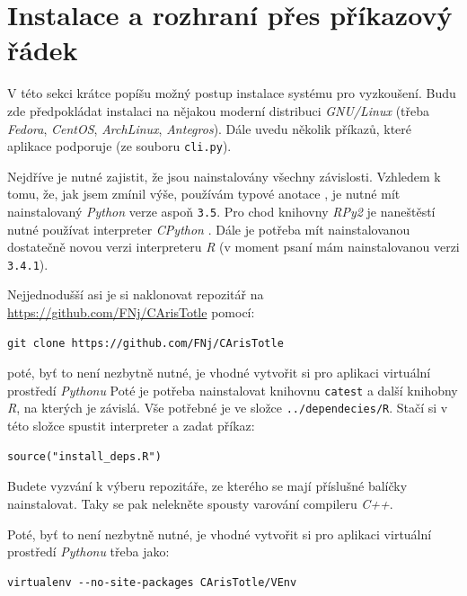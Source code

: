 \documentclass[a4paper,twoside,12pt]{scrbook}
\begin{document}
\newpage %
\appendix %



\section*{Instalace a rozhraní přes příkazový řádek}

V této sekci krátce popíšu možný postup instalace systému pro vyzkoušení. Budu zde předpokládat instalaci na nějakou moderní distribuci \textit{GNU/Linux} (třeba \textit{Fedora}, \textit{CentOS}, \textit{ArchLinux}, \textit{Antegros}). Dále uvedu několik příkazů, které aplikace podporuje (ze souboru \texttt{cli.py}).

Nejdříve je nutné zajistit, že jsou nainstalovány všechny závislosti. Vzhledem k tomu, že, jak jsem zmínil výše, používám typové anotace \cite{PEP484}, je nutné mít nainstalovaný \textit{Python} verze aspoň \texttt{3.5}. Pro chod knihovny \textit{RPy2} je naneštěstí nutné používat interpreter \textit{CPython} \cite{CPython}. Dále je potřeba mít nainstalovanou dostatečně novou verzi interpreteru \textit{R} (v moment psaní mám nainstalovanou verzi \texttt{3.4.1}).

Nejjednodušší asi je si naklonovat repozitář na \url{https://github.com/FNj/CArisTotle} pomocí:
\begin{verbatim}
git clone https://github.com/FNj/CArisTotle
\end{verbatim}
poté, byť to není nezbytně nutné, je vhodné vytvořit si pro aplikaci virtuální prostředí \textit{Pythonu}
Poté je potřeba nainstalovat knihovnu \texttt{catest} a další knihobny \textit{R}, na kterých je závislá. Vše potřebné je ve složce \texttt{../dependecies/R}. Stačí si v této složce spustit interpreter a zadat příkaz:
\begin{verbatim}
source("install_deps.R")
\end{verbatim}
Budete vyzvání k výberu repozitáře, ze kterého se mají příslušné balíčky nainstalovat. Taky se pak nelekněte spousty varování compileru \textit{C++}.

Poté, byť to není nezbytně nutné, je vhodné vytvořit si pro aplikaci virtuální prostředí \textit{Pythonu} třeba jako:
\begin{verbatim}
virtualenv --no-site-packages CArisTotle/VEnv
\end{verbatim}
%
\end{document}
